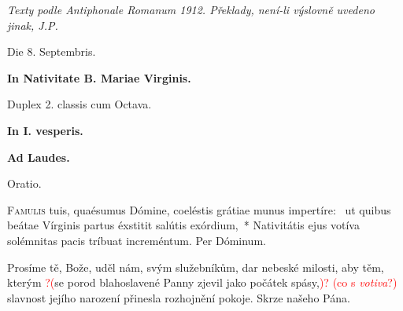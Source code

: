 \documentclass[a4paper, twoside]{article}
\newenvironment{titulusOfficii}{\begin{center}}{\end{center}}
\newcommand{\dies}[1]{#1

}
\newcommand{\nomenFesti}[1]{\textbf{\Large #1}

}
\newcommand{\celebratio}[1]{#1

}
\newcommand{\hora}[1]{\textbf{#1}

}
\newcommand{\notitia}[1]{\textcolor{red}{#1}}
\begin{document}
\emph{Texty podle Antiphonale Romanum 1912. Překlady, není-li výslovně uvedeno
jinak, J.P.}

\begin{titulusOfficii}
\dies{Die 8. Septembris.}
\nomenFesti{In Nativitate B. Mariae Virginis.}
\celebratio{Duplex 2. classis cum Octava.}
\end{titulusOfficii}

\hora{In I. vesperis.}

\hora{Ad Laudes.}

Oratio.
\begin{multicols*}{2}
\lettrine{F}{amulis} tuis, quaésumus Dómine, coeléstis grátiae munus impertíre:~\dag\mbox{}
ut quibus beátae Vírginis partus éxstitit salútis exórdium,~*
Nativitátis ejus votíva solémnitas pacis tríbuat increméntum.
Per Dóminum.

\columnbreak

Prosíme tě, Bože, 
uděl nám, svým služebníkům, dar nebeské milosti,
aby těm, kterým \notitia{?(}se porod blahoslavené Panny zjevil jako počátek spásy,\notitia{)?}
\notitia{(co s \emph{votiva}?)} slavnost jejího narození přinesla
rozhojnění pokoje.
Skrze našeho Pána.
\end{multicols*}
\end{document}
